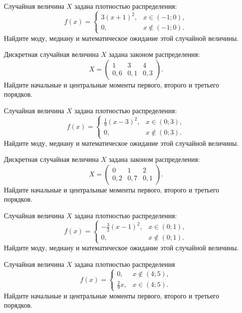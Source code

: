 \vfill

\newpage\setcounter{zad}{0}

\z Случайная величина $X$ задана плотностью распределения: $$f(x) = \begin{cases} 3(x+1)^2, & x \in (-1; 0), \\ 0, & x \not\in (-1; 0). \end{cases}$$ Найдите моду, медиану и математическое ожидание этой случайной величины.


\vfill

\z Дискретная случайная величина $X$ задана законом распределения: $$ X = \left(\begin{array}{rrr}1 & 3 & 4\\0{,}6 & 0{,}1 & 0{,}3\end{array}\right).$$ Найдите начальные и центральные моменты первого, второго и третьего порядков.
 

\vfill

\newpage\setcounter{zad}{0}

\z Случайная величина $X$ задана плотностью распределения: $$f(x) = \begin{cases} \frac{1}{9}(x-3)^2, & x \in (0; 3), \\ 0, & x \not\in (0; 3). \end{cases}$$ Найдите моду, медиану и математическое ожидание этой случайной величины.


\vfill

\z Дискретная случайная величина $X$ задана законом распределения: $$ X = \left(\begin{array}{rrr}0 & 1 & 2\\0{,}2 & 0{,}7 & 0{,}1\end{array}\right).$$ Найдите начальные и центральные моменты первого, второго и третьего порядков.
 

\vfill

\newpage\setcounter{zad}{0}

\z Случайная величина $X$ задана плотностью распределения: $$f(x) = \begin{cases} -\frac{3}{2}(x-1)^2, & x \in (0; 1), \\ 0, & x \not\in (0; 1). \end{cases}$$ Найдите моду, медиану и математическое ожидание этой случайной величины.


\vfill

\z Случайная величина $X$ задана плотностью распределения $$f(x) = \begin{cases}0, & x\not\in(4; 5), \\ \frac{2}{9}x, & x\in(4; 5).\end{cases}$$ Найдите начальные и центральные моменты первого, второго и третьего порядков.
 

